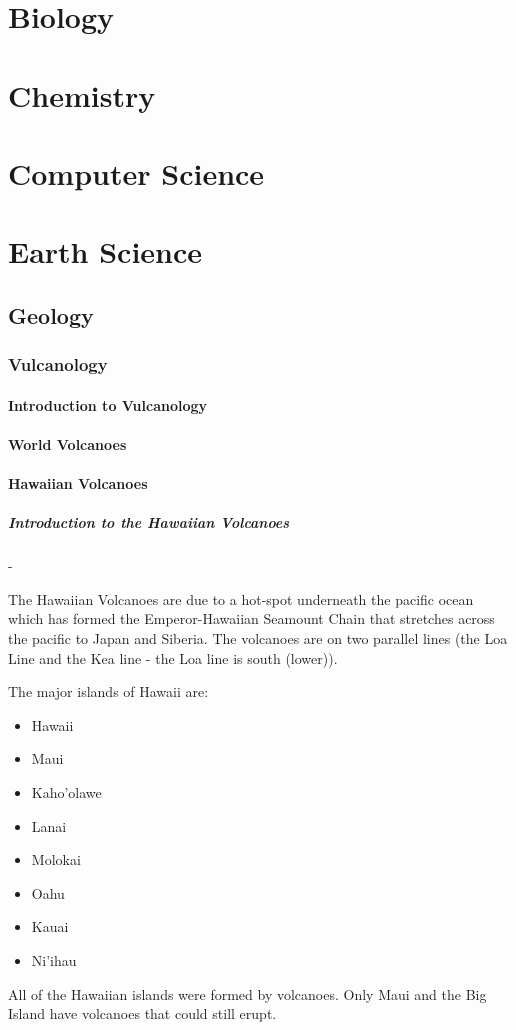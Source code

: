 \documentclass[12pt]{book}
\begin{document}
	\section{Biology}
	\section{Chemistry}
	\section{Computer Science}
	\newpage
	\section{Earth Science}
		\subsection{Geology}
			\subsubsection{Vulcanology}
			\paragraph{Introduction to Vulcanology}
			\paragraph{World Volcanoes}
			\newpage
			\paragraph{Hawaiian Volcanoes}
				\subparagraph{Introduction to the Hawaiian Volcanoes} - 

					The Hawaiian Volcanoes are due to a hot-spot underneath the pacific ocean which has formed the Emperor-Hawaiian Seamount Chain that stretches across the pacific to Japan and Siberia.  The volcanoes are on two parallel lines (the Loa Line and the Kea line - the Loa line is south (lower)).   

					The major islands of Hawaii are: 
					\begin{multicols}{2}
					\begin{itemize}
						\item Hawaii
						\item Maui
						\item Kaho'olawe
						\item Lanai
						\item Molokai
						\item Oahu
						\item Kauai
						\item Ni'ihau
					\end{itemize}
					\end{multicols}
					All of the Hawaiian islands were formed by volcanoes.  Only Maui and the Big Island have volcanoes that could still erupt.  
\end{document}
